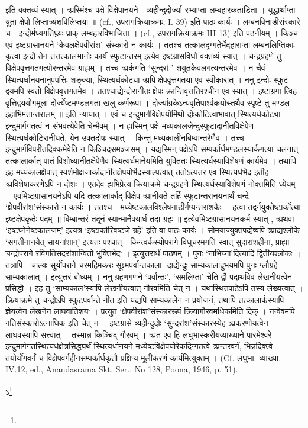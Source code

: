 इति वक्तव्यं स्यात् । त्र्प्रस्मिंश्च पक्षे विक्षेपानयने -
व्यहीन्दुदोर्ज्या रभ्याप्ता लम्बहारकताडिता ।
युद्धार्थाप्ता युता क्षेपो लिप्तात्र्यंशविलिप्तया ॥
(cf., उपरागक्रियाक्रमः, I. 39)
इति पाठः कार्यः । लम्बनविनाडीसंस्कारे च -
इन्दोर्मध्यगतिघ्न्यः प्राक् लम्बहारविभाजिता ।
(cf., उपरागक्रियाक्रमः III 13)
इति पठनीयम् ।
किञ्च एवं इष्टग्रासानयने `केवलक्षेपवीरांश' संस्कारो न कार्यः । ततश्च तत्कालदृग्गतेर्भेदहाराप्ता लम्बनलिप्तिकाः कृत्वा इन्दौ तेन तत्तत्कालभानोः कार्यं स्फुटान्तरम् इत्येव इष्टग्रासविधौ वक्तव्यं स्यात् । चन्द्रग्रहणे तु विक्षेपवृत्तगतगत्योरन्तरमेव ग्राह्यम् । तच्च त्र्प्रर्कगति `सुन्दरां ' शयुतकेवलगत्यन्तरमेव । न चैवं स्थित्यर्धानयनानुपपत्तिः शङ्क्या, स्थित्यर्धकोट्या त्र्प्रपि क्षेपवृत्तगतया एव स्वीकारात् ।
ननु इन्दोः स्फुटं द्वयमपि स्वतो विक्षेपवृत्तगतमेव । ततश्चाद्येन्दोरानीतः क्षेपः क्रान्तिवृत्ततिरश्चीन एव स्यात् ।
इष्टाग्रगा त्विह वृत्तिद्वययोगमूला 
दोर्ज्येष्टमण्डलगता खलु कर्णरूपा ।
दोर्ज्याग्रकेऽन्यवृतिपार्श्वकयोस्तथैव 
स्पृष्टे तु मण्डल इहाभिमतान्तरालम् ॥
इति न्यायात् ।
एवं च इन्दुमार्गविक्षेपयोर्मिथो दोःकोटित्वाभावात् स्थित्यर्धकोट्या इन्दुमार्गगतत्वं न संभवत्येवेति चेन्मैवम् । न ह्यस्मिन् पक्षे मध्यकालजेन्दुस्फुटादानीतविक्षेपेण स्थित्यर्धकोटिरानीयते, येन उक्तदोषः स्यात् । किन्तु मध्यकालीनबिम्वान्तरेणैव । तच्च इन्दुमार्गविपरीतदिक्कमेवेति न किञ्चिदसमञ्जसम् ।
यद्यस्मिन् पक्षेऽपि सम्पर्कार्धमण्डलस्यार्कगत्या चलनात् तत्कालार्कात् पातं विशोध्यानीतक्षेपेणैव स्थित्यर्धमानेयमिति युक्तितः स्थित्यर्धस्याविशेषणं कार्यमेव । तथापि इह मध्यकालक्षेपात् स्पर्शमोक्षजार्कादानीतक्षेपयोर्भेदस्याल्पत्वात् ततोऽल्पतर एव स्थित्यर्धभेद इतीह त्र्प्रविशेषाकरणेऽपि न दोशः । एतदेव ह्यभिप्रेत्य क्रियाक्रमे चन्द्रग्रहणे स्थित्यर्धस्याविशेषणं नोक्तमिति ध्येयम् ।
एवमिष्टग्रासानयनेऽपि यदि तत्कालार्काद् विक्षेप त्र्प्रानीयते तर्हि स्फुटान्तरानयनार्थं चन्द्रे `क्षेपवीरांश'संस्कारो न कार्यः । ततश्च -
मध्येष्टकालविश्लेषनाडीर्गप्यन्तरांशकैः ।
हत्वा तद्वर्गयुक्तेष्टार्कोत्था इष्टक्षेपकृतेः पदम् ॥
बिम्बान्तरं तदूनं स्यान्मानैक्यार्धं तदा ग्रहः ॥
इत्येवमिष्टग्रासानयनकर्म स्यात् , त्र्प्रथवा `इष्टघ्नेनेष्टकालजम्' इत्यत्र `इष्टार्कात्त्विष्टजे ग्रहे' इति वा पाठः कार्यः । सोमयाज्युक्तपद्येष्वपि त्र्प्राद्यश्लोके `सगतीनानयेत् सायनांशान्' इत्यतः पश्चात् -
किन्त्वर्कस्योपरागे विधुचरमगति स्वात् सुदारांशहीना, 
प्राह्या चन्द्रोपरागे रविगतिसदरांशान्वितो भुक्तिभेदः ।
इत्युत्तरार्धं पाठ्यम् ।
पुनः `नाभिघ्ना'दित्यादि द्वितीयश्लोकः । तत्रापि -
चाल्यः सूर्योपरागे चरमहिमकरः सूक्ष्मपर्वान्तकाला-
दाद्येन्दुः साम्यकालादुभयमपि पुनः ग्लौग्रहे साम्यकालात् ।
इत्युत्तरं बोध्यम् ।
ननु ग्रहणगणने `पर्वान्तः', `समलिप्ता' चेति द्वौ पदार्थावेव लेखनीयत्वेन प्रसिद्धौ । इह तु `साम्यकाल'स्यापि लेखनीयत्वात् गौरवमिति चेत् न । यथास्थितपाठेऽपि तस्य लेख्यत्वात् । क्रियाक्रमे तु चन्द्रोऽपि स्फुटपर्वान्ते नीत इति यद्यपि साम्यकालेन न प्रयोजनं, तथापि तत्कालार्कस्यापि ज्ञेयत्वेन लेखनेन लाघवातिशयः । प्रत्युत `क्षेपवीरांश'संस्काररूपं क्रियागौरवमधिकमिति दिक् ।
नन्वेवमपि गतिसंस्कारोऽत्नाधिक इति चेत् न । इष्टग्रासे व्यहीन्दुदोः `सुन्दरांश'संस्कारस्येह त्र्प्रकरणोयत्वेन लाघवस्यापि सत्त्वात् । तस्मान्न किञ्चिद् गौरवम् । त्र्प्रत एव हि लघुभास्करीयव्याख्याने पारमेश्वरे इन्दुमार्गगतस्थित्यर्धक्षेत्रसिद्ध्यर्थं स्थित्यर्धानयने मध्येष्टविक्षेपयोरेकदिग्गतत्वे त्र्प्रन्तरवर्गं, भिन्नदिक्त्वे तयोर्योगवर्गं च विक्षेपवर्गहीनसम्पर्कार्धकृतौ प्रक्षिप्य मूलीकरणं कार्यमित्युक्तम् । (Cf. लघुभा. व्याख्या. IV.12, ed., Anandasrama Skt. Ser., No 128, Poona, 1946, p. 51).

ऽ\footnote{}
